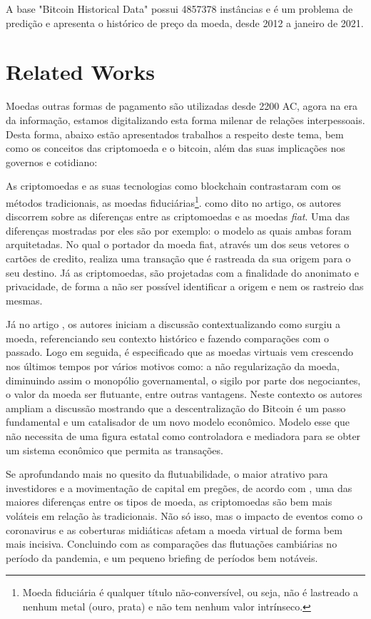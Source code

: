 \documentclass[sigplan,screen]{acmart}
\begin{document}
A base "Bitcoin Historical Data" possui 4857378 instâncias e é um problema de predição e apresenta o histórico de preço da moeda, desde 2012 a janeiro de 2021.

\section{Related Works}
Moedas outras formas de pagamento são utilizadas desde 2200 AC, agora na era da informação, estamos digitalizando esta forma milenar de relações interpessoais.
Desta forma, abaixo estão apresentados trabalhos a respeito deste tema, bem como os conceitos das criptomoeda e o bitcoin, além das suas implicações nos governos e cotidiano:

As criptomoedas e as suas tecnologias como blockchain contrastaram com os métodos tradicionais, as moedas fiduciárias\footnote{
  Moeda fiduciária é qualquer título não-conversível, ou seja, não é lastreado a nenhum metal (ouro, prata) e não tem nenhum valor intrínseco.\cite{lara2008estudo}
}. 
como dito no artigo\cite{8567098}, os autores discorrem sobre as diferenças entre as criptomoedas e as moedas \textit{fiat}. 
Uma das diferenças mostradas por eles são por exemplo: o modelo as quais ambas foram arquitetadas.
No qual o portador da moeda fiat, através um dos seus vetores o cartões de credito, realiza uma transação que é rastreada da sua origem para o seu destino.
Já as criptomoedas, são projetadas com a finalidade do anonimato e privacidade, de forma a não ser possível identificar a origem e nem os rastreio das mesmas.

Já no artigo \cite{ADMREV2413}, os autores iniciam a discussão contextualizando como surgiu a moeda, referenciando seu contexto histórico e fazendo comparações com o passado.
Logo em seguida, é especificado que as moedas virtuais vem crescendo nos últimos tempos por vários motivos como: a não regularização da moeda, diminuindo assim o monopólio governamental, o sigilo por parte dos negociantes, o valor da moeda ser flutuante, entre outras vantagens.
Neste contexto os autores ampliam a discussão mostrando que a descentralização do Bitcoin é um passo fundamental e um catalisador de um novo modelo econômico.
Modelo esse que não necessita de uma figura estatal como controladora e mediadora para se obter um sistema econômico que permita as transações.

Se aprofundando mais no quesito da flutuabilidade, o maior atrativo para investidores e a movimentação de capital em pregões, de acordo com \cite{UMAR2021121025}, uma das maiores diferenças entre os tipos de moeda, as criptomoedas são bem mais voláteis em relação às tradicionais.
Não só isso, mas o impacto de eventos como o coronavirus e as coberturas midiáticas afetam a moeda virtual de forma bem mais incisiva. 
Concluindo com as comparações das flutuações cambiárias no período da pandemia, e um pequeno briefing de períodos bem notáveis.
\end{document}
